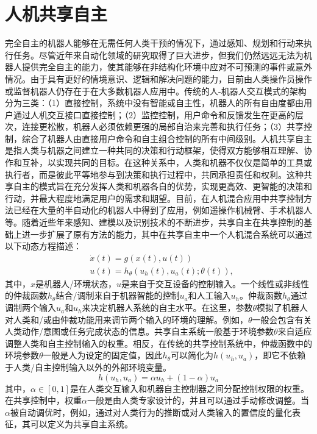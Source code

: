 \section{人机共享自主}
完全自主的机器人能够在无需任何人类干预的情况下，通过感知、规划和行动来执行任务。尽管近年来自动化领域的研究取得了巨大进步，但我们仍然远远无法为机器人提供完全自主的能力，使其能够在非结构化环境中应对不可预测的事件或意外情况。由于具有更好的情境意识、逻辑和解决问题的能力，目前由人类操作员操作或监督机器人仍存在于在大多数机器人应用中。传统的人-机器人交互模式的架构分为三类：（1）直接控制，系统中没有智能或自主性，机器人的所有自由度都由用户通过人机交互接口直接控制；（2）监控控制，用户命令和反馈发生在更高的层次，连接更松散，机器人必须依赖更强的局部自治来完善和执行任务；（3）共享控制，综合了机器人由直接用户命令和自主组合控制的所有中间级别。人机共享自主是指人类与机器之间建立一种共同的决策和行动框架，使得双方能够相互理解、协作和互补，以实现共同的目标。在这种关系中，人类和机器不仅仅是简单的工具或执行者，而是彼此平等地参与到决策和执行过程中，共同承担责任和权利。这种共享自主的模式旨在充分发挥人类和机器各自的优势，实现更高效、更智能的决策和行动，并最大程度地满足用户的需求和期望\cite{selvaggioAutonomyPhysicalHumanRobot2021a}。目前，在人机混合应用中共享控制方法已经在大量的半自动化的机器人中得到了应用，例如遥操作机械臂、手术机器人等。随着近些年来感知、建模以及识别技术的不断进步，共享自主在共享控制的基础上进一步扩展了原有方法的能力，其中在共享自主中一个人机混合系统可以通过以下动态方程描述：
\begin{equation}
    \begin{aligned}
    & \dot{x}(t)=g(x(t), u(t)) \\
    & u(t)=h_\theta\left(u_h(t), u_a(t) ; \theta(t)\right),
    \end{aligned}
    \label{eq:2-1}
\end{equation}
其中，$x$是机器人/环境状态，$u$是来自于交互设备的控制输入。一个线性或非线性的仲裁函数$h_θ$结合/调制来自于机器智能的控制$u_a$和人工输入$u_h$。仲裁函数$h_θ$通过调制两个输入$u_a$和$u_h$来决定机器人系统的自主水平。在这里，参数$θ$模拟了机器人对人类和/或由仲裁功能用来调节两个输入的环境的理解。例如，$θ$一般会包含有关人类动作/意图或任务完成状态的信息。共享自主系统一般基于环境参数$θ$来自适应调整人类和自主控制输入的权重。相反，在传统的共享控制系统中，仲裁函数中的环境参数$θ$一般是人为设定的固定值，因此$h_θ$可以简化为$h(u_h,u_a)$，即它不依赖于人类/自主控制输入以外的外部环境变量。
\begin{equation}
    h\left(u_h, u_a\right)=\alpha u_h+(1-\alpha) u_a
    \label{eq:2-2}
\end{equation}
其中，$α∈[0,1]$是在人类交互输入和机器自主控制器之间分配控制权限的权重。在共享控制中，权重$α$一般是由人类专家设计的，并且可以通过手动修改调整。当$α$被自动调优时，例如，通过对人类行为的推断或对人类输入的置信度的量化表征，其可以定义为共享自主系统。

